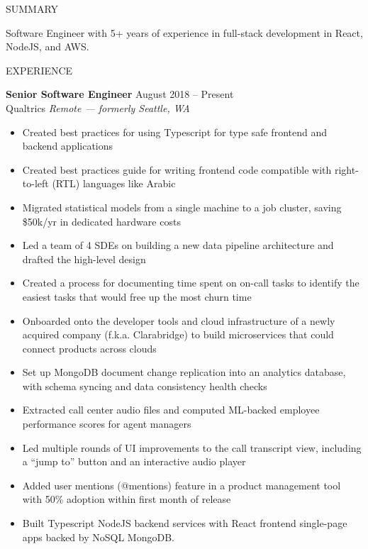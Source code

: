 \documentclass{resume} %
\begin{document}
\begin{rSection}{SUMMARY}

	{Software Engineer with 5+ years of experience in full-stack development in React, NodeJS, and AWS.}

\end{rSection}


\begin{rSection}{EXPERIENCE}

	\textbf{Senior Software Engineer} \hfill August 2018 -- Present\\
	Qualtrics \hfill \textit{Remote --- formerly Seattle, WA}
	\begin{itemize}
		\itemsep -3pt {}
		\item Created best practices for using Typescript for type safe frontend and backend applications
		\item Created best practices guide for writing frontend code compatible with right-to-left (RTL) languages like Arabic
		\item Migrated statistical models from a single machine to a job cluster, saving \$50k/yr in dedicated hardware costs
		\item Led a team of 4 SDEs on building a new data pipeline architecture and drafted the high-level design
		\item Created a process for documenting time spent on on-call tasks to identify the easiest tasks that would free up the most churn time
		\item Onboarded onto the developer tools and cloud infrastructure of a newly acquired company (f.k.a. Clarabridge) to build microservices that could connect products across clouds
		\item Set up MongoDB document change replication into an analytics database, with schema syncing and data consistency health checks
		\item Extracted call center audio files and computed ML-backed employee performance scores for agent managers
		\item Led multiple rounds of UI improvements to the call transcript view, including a “jump to” button and an interactive audio player
		\item Added user mentions (@mentions) feature in a product management tool with 50\% adoption within first month of release
        \item Built Typescript NodeJS backend services with React frontend single-page apps backed by NoSQL MongoDB.
	\end{itemize}


\end{rSection}
\end{document}
